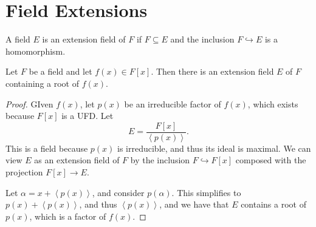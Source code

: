 \chapter{Field Extensions}
\begin{definition}\label{dfn:4.1}
	A field $E$ is an extension field of $F$ if $F\subseteq E$ and the inclusion $F\hookrightarrow E$ is a homomorphism.
\end{definition}
\begin{theorem}\label{thm:4.1}
	Let $F$ be a field and let $f(x)\in F[x]$. Then there is an extension field $E$ of $F$ containing a root of $f(x)$.
\end{theorem}
\begin{proof}
	GIven $f(x)$, let $p(x)$ be an irreducible factor of $f(x)$, which exists because $F[x]$ is a UFD. Let
	\[
		E=\frac{F[x]}{\left\langle p(x) \right\rangle } 
	.\]
	This is a field because $p(x)$ is irreducible, and thus its ideal is maximal. We can view $E$ as an extension field of $F$ by the inclusion $F\hookrightarrow F[x]$ composed with the projection $F[x]\to E$.

	Let $\alpha =x+\left\langle p(x) \right\rangle $, and consider $p(\alpha )$. This simplifies to $p(x)+\left\langle p(x) \right\rangle $, and thus $\left\langle p(x) \right\rangle $, and we have that $E$ contains a root of $p(x)$, which is a factor of $f(x)$.
\end{proof}

